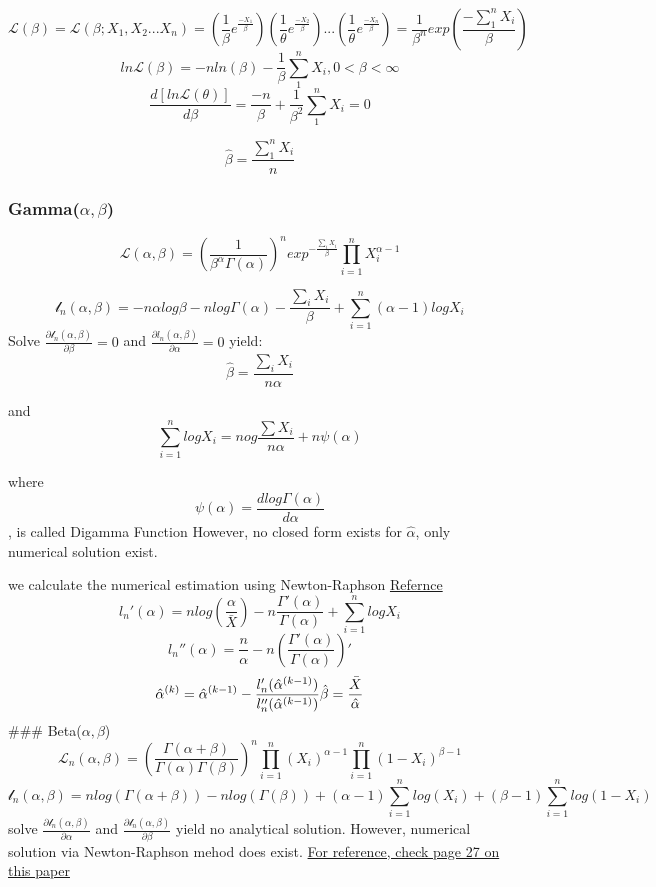 \documentclass[]{article}
\begin{document}
\[
\mathcal{L}(\beta)=\mathcal{L}\left(\beta;{X}_{1},{X}_{2}...{X}_{n} \right)=\left(\frac{1}{\beta}{e}^{\frac{{-X}_{1}}{\beta}}\right)\left(\frac{1}{\theta}{e}^{\frac{{-X}_{2}}{\beta}}\right)...\left(\frac{1}{\theta}{e}^{\frac{{-X}_{n}}{\beta}} \right)=\frac{1}{{\beta}^{n}}exp\left(\frac{-\sum_{1}^{n}{X}_{i}}{\beta} \right)
\] \[
ln \mathcal{L}\left(\beta\right)=-n ln\left(\beta\right) -\frac{1}{\beta}\sum_{1}^{n}{X}_{i}, 0<\beta<\infty\]
\[
\frac{d\left[ln \mathcal{L}\left(\theta\right) \right]}{d\beta}=\frac{-n }{\beta} +\frac{1}{{\beta}^{2}}\sum_{1}^{n}{X}_{i}=0
\]

\[
\hat{\beta}=\frac{\sum_{1}^{n}{X}_{i}}{n}
\]

\hypertarget{gammaalpha-beta}{%
\subsubsection{\texorpdfstring{Gamma(\(\alpha, \beta\))}{Gamma(\textbackslash{}alpha, \textbackslash{}beta)}}\label{gammaalpha-beta}}

\[
\mathcal{L}(\alpha, \beta)=(\frac{1}{\beta^\alpha \Gamma(\alpha)})^n exp^{-\frac{\sum_iX_i}{\beta}} \prod_{i=1}^n X_i^{\alpha-1}
\]

\[
\mathcal{l}_n(\alpha, \beta)=
-n \alpha log \beta -n log\Gamma(\alpha) -\frac{\sum_i X_i}{\beta}
+\sum_{i=1}^n (\alpha -1) log X_i
\] Solve
\(\frac{\partial \mathcal{l}_n(\alpha, \beta)}{\partial \beta}=0\) and
\(\frac{\partial l_n(\alpha, \beta)}{ \partial \alpha}=0\) yield: \[
\hat{\beta}=\frac{\sum_i X_i}{n\alpha}
\]

and \[
\sum_{i=1}^n log X_i = n og \frac{\sum X_i}{n \alpha} + n \psi(\alpha) 
\]

where \[\psi(\alpha)=\frac{d log \Gamma(\alpha) }{d \alpha}\], is called
Digamma Function However, no closed form exists for \(\hat{\alpha}\),
only numerical solution exist.

we calculate the numerical estimation using Newton-Raphson
\href{http://bioops.info/2015/01/gamma-mme-mle/}{Refernce} \[
l_n'(\alpha)=n log(\frac{\alpha}{\bar{X}})-n\frac{\Gamma'(\alpha)}{\Gamma(\alpha)}+\sum_{i=1}^nlog X_i
\] \[
l_n''(\alpha)=\frac{n}{\alpha}-n(\frac{\Gamma'(\alpha)}{\Gamma(\alpha)})'
\] \[
\hat{\alpha}^{(k)}=\hat{\alpha}^{(k-1)}- \frac{l_n'(\hat{\alpha} ^{(k-1)})} {l_n''(\hat{\alpha} ^{(k-1)})}
\\
\hat{\beta}=\frac{\bar{X}}{\hat{\alpha}}
\] \#\#\# Beta(\(\alpha, \beta\)) \[
\mathcal{L}_n(\alpha, \beta)=(\frac{\Gamma(\alpha +\beta)}{\Gamma(\alpha)\Gamma(\beta)})^n \prod_{i=1}^n(X_i)^{\alpha-1}
\prod_{i=1}^n(1-X_i)^{\beta-1}
\] \[
\mathcal{l}_n(\alpha, \beta)=nlog( \Gamma (\alpha +\beta) ) -n log( \Gamma(\beta)) +(\alpha-1)\sum_{i=1}^n log(X_i)+(\beta-1) \sum_{i=1}^n log(1-X_i)
\] solve
\(\frac{\partial \mathcal{l}_n(\alpha, \beta)}{ \partial \alpha}\) and
\(\frac{ \partial \mathcal{l}_n(\alpha, \beta)}{\partial \beta}\) yield
no analytical solution. However, numerical solution via Newton-Raphson
mehod does exist.
\href{https://scholarsarchive.byu.edu/cgi/viewcontent.cgi?article=2613\&context=etd}{For
reference, check page 27 on this paper}
\end{document}
